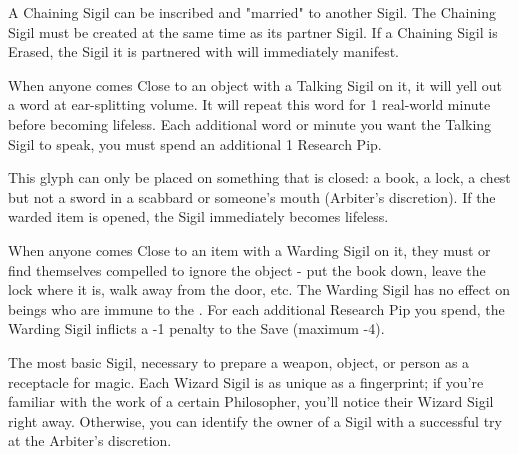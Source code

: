 
\cbreak






A Chaining Sigil can be inscribed and "married" to another Sigil.  The Chaining Sigil must be created at the same time as its partner Sigil.  If a Chaining Sigil is Erased, the Sigil it is partnered with will immediately manifest.



When anyone comes Close to an object with a Talking Sigil on it, it will yell out a word at ear-splitting volume.  It will repeat this word for 1 real-world minute before becoming lifeless.  Each additional word or minute you want the Talking Sigil to speak, you must spend an additional 1 Research Pip.


This glyph can only be placed on something that is closed: a book, a lock, a chest but not a sword in a scabbard or someone's mouth (Arbiter's discretion).  If the warded item is opened, the Sigil immediately becomes lifeless.

When anyone comes Close to an item with a Warding Sigil on it, they must  or find themselves compelled to ignore the object - put the book down, leave the lock where it is, walk away from the door, etc. The Warding Sigil has no effect on beings who are immune to the . For each additional Research Pip you spend, the Warding Sigil inflicts a -1 penalty to the Save (maximum -4).


The most basic Sigil, necessary to prepare a weapon, object, or person as a receptacle for magic. Each Wizard Sigil is as unique as a fingerprint; if you're familiar with the work of a certain Philosopher, you'll notice their Wizard Sigil right away.  Otherwise, you can identify the owner of a Sigil with a successful  try at the Arbiter's discretion.

